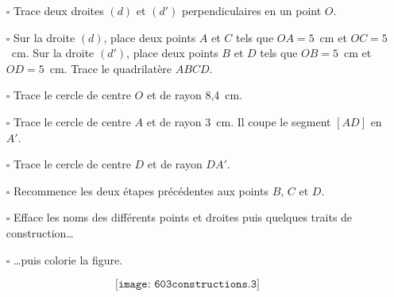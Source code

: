 \begin{cursive}
\begin{itemize}
\item[$\square$] Trace deux droites $(d)$ et $(d')$ perpendiculaires en un point $O$.
\item[$\square$] Sur la droite $(d)$, place deux points $A$ et $C$ tels que $OA=5$~cm et $OC=5$~cm. Sur la droite $(d')$, place deux points $B$ et $D$ tels que $OB=5$~cm et $OD=5$~cm. Trace le quadrilatère $ABCD$.
\item[$\square$] Trace le cercle de centre $O$ et de rayon 8,4~cm.
\item[$\square$] Trace le cercle de centre $A$ et de rayon 3~cm. Il coupe le segment $[AD]$ en $A'$.
\item[$\square$] Trace le cercle de centre $D$ et de rayon $DA'$.
\item[$\square$] Recommence les deux étapes précédentes aux points $B$, $C$ et $D$.
\item[$\square$] Efface les noms des différents points et droites puis quelques traits de construction\ldots
\item[$\square$] \ldots puis colorie la figure.
\end{itemize}
\end{cursive}
\[\texttt{[image: 603constructions.3]}\]
